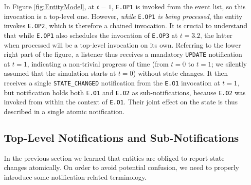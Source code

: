 In Figure \ref{fig:EntityModel},
  at $t=1$,
  \lstinline|E.OP1| is invoked from the event list,
  so this invocation is a top-level one.
However,
  {\em while\/} \lstinline|E.OP1| {\em is being processed},
  the entity invokes \lstinline|E.OP2|,
  which is therefore a chained invocation.
It is crucial to understand that
  while \lstinline|E.OP1| also
  schedules the invocation of \lstinline|E.OP3|
  at $t=3.2$,
  the latter when processed will be a top-level invocation
  on its own.
Referring to the lower right part of the figure,
  a listener thus receives a mandatory \lstinline|UPDATE|
  notification at $t=1$,
  indicating a non-trivial progress of time
  (from $t=0$ to $t=1$; we silently assumed that
   the simulation starts at $t=0$)
  without state changes.
It then receives a single \lstinline|STATE_CHANGED|
  notification from the \lstinline|E.O1|
  invocation at $t=1$,
  but notification holds both
  \lstinline|E.O1| and \lstinline|E.O2|
  as sub-notifications,
  because \lstinline|E.O2|
  was invoked from within the
  context of \lstinline|E.O1|.
Their joint effect on the state
  is thus described in a single atomic notification.

\subsection{Top-Level Notifications and Sub-Notifications}

In the previous section
  we learned that entities are obliged to report
  state changes atomically.
On order to avoid potential confusion,
  we need to properly introduce
  some notification-related terminology.
  
